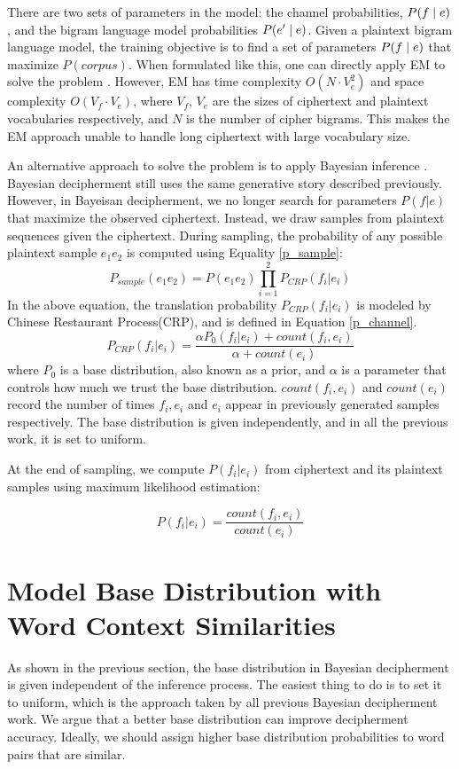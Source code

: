 There are two sets of parameters in the model: the channel probabilities, $P(f \mid e)$, and the bigram language model probabilities $P(e' \mid e)$. Given a plaintext bigram language model, the training objective is to find a set of parameters $P(f \mid e)$ that maximize $P(corpus)$. When formulated like this, one can directly apply EM to solve the problem \cite{knight-EtAl:2006}. However, EM has time complexity $O( N\cdot V_{e}^{2})$ and space complexity $O(V_{f}\cdot V_{e})$, where $V_{f}$, $V_{e}$ are the sizes of ciphertext and plaintext vocabularies respectively, and $N$ is the number of cipher bigrams. This makes the EM approach unable to handle long ciphertext with large vocabulary size. 

An alternative approach to solve the problem is to apply Bayesian inference \cite{ravi-knight:2011,Dou:2012}. Bayesian decipherment still uses the same generative story described previously. However, in Bayeisan decipherment, we no longer search for parameters $P(f|e)$ that maximize the observed ciphertext. Instead, we draw samples from plaintext sequences given the ciphertext. During sampling, the probability of any possible plaintext sample $e_{1}e_{2}$ is computed using Equality \ref{p_sample}:
%
\[
\label{p_sample}
P_{sample}(e_{1}e_{2}) =  P(e_{1}e_{2}) \prod_{i=1}^{2}P_{CRP}(f_{i}|e_{i})
\]
%
In the above equation, the translation probability $P_{CRP}(f_{i}|e_{i})$ is modeled by Chinese Restaurant Process(CRP), and is defined in Equation \ref{p_channel}.
%
\[
\label{p_channel}
P_{CRP}(f_{i}|e_{i}) = \frac{\alpha P_0(f_{i}|e_{i})+count(f_{i},e_{i})}{\alpha+count(e_{i})}
\]
%
where $P_{0}$ is a base distribution, also known as a prior, and $\alpha$ is a parameter that controls how much we trust the base distribution. $count(f_{i},e_{i})$ and $count(e_{i})$ record the number of times $f_{i},e_{i}$ and $e_{i}$ appear in previously generated samples respectively. The base distribution is given independently, and in all the previous work, it is set to uniform.

At the end of sampling, we compute $P(f_{i}|e_{i})$ from ciphertext and its plaintext samples using maximum likelihood estimation:

\[
\label{mlh_estimation}
P(f_{i}|e_{i}) =  \frac{count(f_{i},e_{i})}{count(e_{i})}
\]

\section{Model Base Distribution with Word Context Similarities}
As shown in the previous section, the base distribution in Bayesian decipherment is given independent of the inference process. The easiest thing to do is to set it to uniform, which is the approach taken by all previous Bayesian decipherment work. We argue that a better base distribution can improve decipherment accuracy. Ideally, we should assign higher base distribution probabilities to word pairs that are similar.

